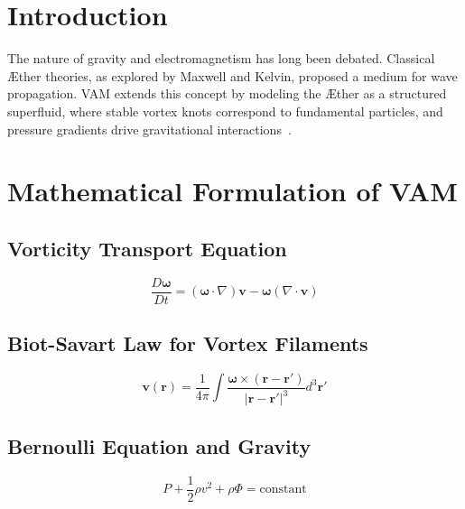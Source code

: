 \documentclass[a4paper,10pt]{article}
\begin{document}
    \section{Introduction}\label{sec:introduction}
    The nature of gravity and electromagnetism has long been debated. Classical \AE ther theories, as explored by Maxwell and Kelvin, proposed a medium for wave propagation.
    VAM extends this concept by modeling the \AE ther as a structured superfluid, where stable vortex knots correspond to fundamental particles, and pressure gradients drive gravitational interactions~\cite{maxwell1861, clausius1865, helmholtz1858, kelvin1867, verlinde2010, scalo2017}.

    \section{Mathematical Formulation of VAM}\label{sec:mathematical-formulation-of-vam}

    \subsection{Vorticity Transport Equation}\label{subsec:vorticity-transport-equation}
    \begin{equation} \label{eq:vorticity}
        \frac{D\boldsymbol{\omega}}{Dt} = (\boldsymbol{\omega} \cdot \nabla) \mathbf{v} - \boldsymbol{\omega} (\nabla \cdot \mathbf{v})
    \end{equation}


    \subsection{Biot-Savart Law for Vortex Filaments}\label{subsec:biot-savart-law-for-vortex-filaments}
    \begin{equation}
        \mathbf{v}(\mathbf{r}) = \frac{1}{4\pi} \int \frac{\boldsymbol{\omega} \times (\mathbf{r} - \mathbf{r'})}{|\mathbf{r} - \mathbf{r'}|^3} d^3\mathbf{r'}\label{eq:equation}
    \end{equation}

    \subsection{Bernoulli Equation and Gravity}\label{subsec:bernoulli-equation-and-gravity}
    \begin{equation}
        P + \frac{1}{2} \rho v^2 + \rho \Phi = \text{constant}\label{eq:equation2}
    \end{equation}
\end{document}
